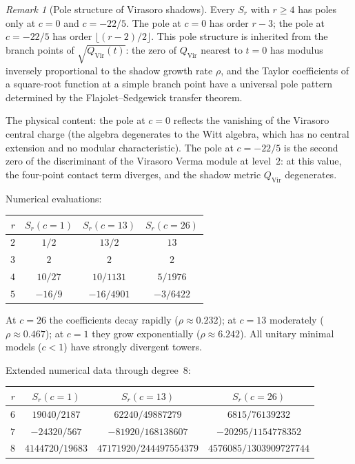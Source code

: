 \documentclass[11pt,reqno]{amsart}
\theoremstyle{definition}
\theoremstyle{remark}
\newtheorem{remark}[theorem]{Remark}
\newcommand{\Vir}{\mathrm{Vir}}
\numberwithin{equation}{section}
\begin{document}
\begin{remark}[Pole structure of Virasoro
shadows]\label{rem:pole-structure}
Every $S_r$ with $r \ge 4$ has poles only at $c = 0$ and
$c = -22/5$. The pole at $c = 0$ has order $r - 3$; the
pole at $c = -22/5$ has order $\lfloor(r-2)/2\rfloor$.
This pole structure is inherited from the branch points of
$\sqrt{Q_{\Vir}(t)}$: the zero of $Q_{\Vir}$ nearest to
$t = 0$ has modulus inversely proportional to the shadow
growth rate $\rho$, and the Taylor coefficients of a
square-root function at a simple branch point have a
universal pole pattern determined by the Flajolet--Sedgewick
transfer theorem.

The physical content: the pole at $c = 0$ reflects the
vanishing of the Virasoro central charge (the algebra
degenerates to the Witt algebra, which has no central
extension and no modular characteristic). The pole at
$c = -22/5$ is the second zero of the discriminant of the
Virasoro Verma module at level~$2$: at this value, the
four-point contact term diverges, and the shadow metric
$Q_{\Vir}$ degenerates.
\end{remark}

Numerical evaluations:

\begin{center}
\renewcommand{\arraystretch}{1.2}
\begin{tabular}{rccc}
\toprule
$r$ & $S_r(c{=}1)$ & $S_r(c{=}13)$ & $S_r(c{=}26)$ \\
\midrule
$2$ & $1/2$ & $13/2$ & $13$ \\
$3$ & $2$ & $2$ & $2$ \\
$4$ & $10/27$ & $10/1131$ & $5/1976$ \\
$5$ & $-16/9$ & $-16/4901$ & $-3/6422$ \\
\bottomrule
\end{tabular}
\end{center}

\noindent At $c = 26$ the coefficients decay rapidly
($\rho \approx 0.232$); at $c = 13$ moderately
($\rho \approx 0.467$); at $c = 1$ they grow
exponentially ($\rho \approx 6.242$). All unitary
minimal models ($c < 1$) have strongly divergent towers.

Extended numerical data through degree~$8$:

\begin{center}
\renewcommand{\arraystretch}{1.2}
\begin{tabular}{rccc}
\toprule
$r$ & $S_r(c{=}1)$ & $S_r(c{=}13)$ & $S_r(c{=}26)$ \\
\midrule
$6$ & $19040/2187$ & $62240/49887279$
 & $6815/76139232$ \\
$7$ & $-24320/567$ & $-81920/168138607$
 & $-20295/1154778352$ \\
$8$ & $4144720/19683$ & $47171920/244497554379$
 & $4576085/1303909727744$ \\
\bottomrule
\end{tabular}
\end{center}
\end{document}
